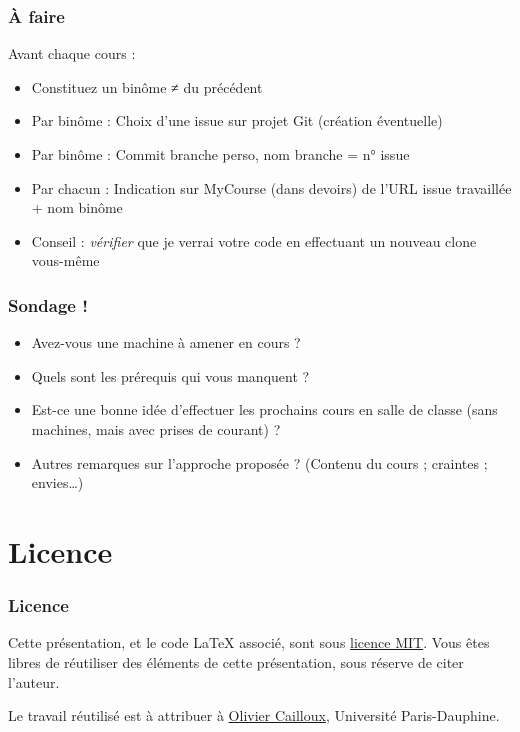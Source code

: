 \documentclass[english, french]{beamer}
\begin{document}
\begin{frame}
	\frametitle{À faire}
	Avant chaque cours :
	\begin{itemize}
		\item Constituez un binôme ≠ du précédent
		\item Par binôme : Choix d’une issue sur projet Git (création éventuelle)
		\item Par binôme : Commit branche perso, nom branche = n° issue
		\item Par chacun : Indication sur MyCourse (dans devoirs) de l’URL issue travaillée + nom binôme
		\item Conseil : \emph{vérifier} que je verrai votre code en effectuant un nouveau clone vous-même
	\end{itemize}
\end{frame}

\begin{frame}
	\frametitle{Sondage !}
	\begin{itemize}
		\item Avez-vous une machine à amener en cours ?
		\item Quels sont les prérequis qui vous manquent ?
		\item Est-ce une bonne idée d’effectuer les prochains cours en salle de classe (sans machines, mais avec prises de courant) ?
		\item Autres remarques sur l’approche proposée ? (Contenu du cours ; craintes ; envies…)
	\end{itemize}
\end{frame}

\appendix
\section{Licence}
\begin{frame}
	\frametitle{Licence}
	Cette présentation, et le code LaTeX associé, sont sous \href{http://opensource.org/licenses/MIT}{licence MIT}. Vous êtes libres de réutiliser des éléments de cette présentation, sous réserve de citer l’auteur.
	
	Le travail réutilisé est à attribuer à \href{http://www.lamsade.dauphine.fr/~ocailloux/}{Olivier Cailloux}, Université Paris-Dauphine.
\end{frame}
\end{document}
